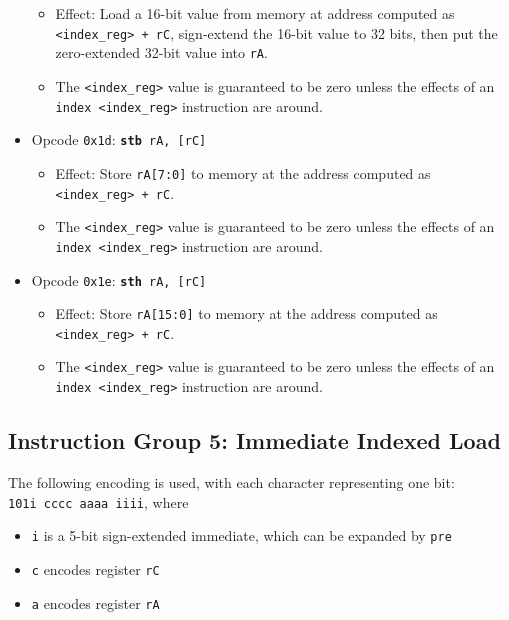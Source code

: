 \documentclass{article}
\begin{document}
\begin{itemize}
		\begin{itemize}
			\item Effect:  Load a 16-bit value from memory at address
			computed as \texttt{<index\_reg> + \texttt{rC}}, sign-extend
			the 16-bit value to 32 bits, then put the zero-extended 32-bit
			value into \texttt{rA}.
			\item The \texttt{<index\_reg>} value is guaranteed to be zero
			unless the effects of an \texttt{index <index\_reg>}
			instruction are around.
		\end{itemize}
		\item Opcode \texttt{0x1d}:
			\texttt{\textbf{stb} rA, [rC]}
		\begin{itemize}
			\item Effect:  Store \texttt{rA[7:0]} to memory at the address
			computed as \texttt{<index\_reg> + rC}.
			\item The \texttt{<index\_reg>} value is guaranteed to be zero
			unless the effects of an \texttt{index <index\_reg>}
			instruction are around.
		\end{itemize}
		\item Opcode \texttt{0x1e}:
			\texttt{\textbf{sth} rA, [rC]}
		\begin{itemize}
			\item Effect:  Store \texttt{rA[15:0]} to memory at the address
			computed as \texttt{<index\_reg> + rC}.
			\item The \texttt{<index\_reg>} value is guaranteed to be zero
			unless the effects of an \texttt{index <index\_reg>}
			instruction are around.
		\end{itemize}

	\end{itemize}

	\doublespacing
	\subsection{Instruction Group 5:  Immediate Indexed Load}
	The following encoding is used, with each character representing one
	bit:  \\
	\texttt{101i cccc aaaa iiii}, where

	\singlespacing
	\begin{itemize}
		\item \texttt{i} is a 5-bit sign-extended immediate, which can
		be expanded by \texttt{pre}  
		\item \texttt{c} encodes register \texttt{rC}
		\item \texttt{a} encodes register \texttt{rA}
	\end{itemize}
	\doublespacing
\end{document}
